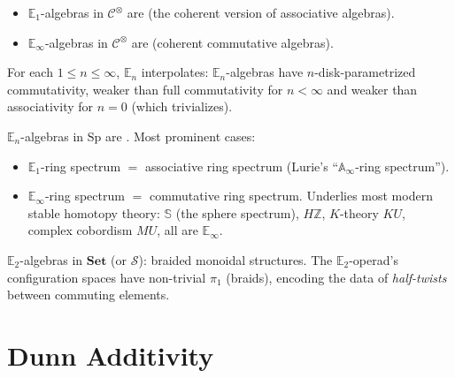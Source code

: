 \begin{theorem}
\label{thm:en-endpoints}
\begin{itemize}
  \item $\mathbb{E}_1$-algebras in $\mathcal{C}^\otimes$ are
         (the
        coherent version of associative algebras).
  \item $\mathbb{E}_\infty$-algebras in $\mathcal{C}^\otimes$ are
         (coherent
        commutative algebras).
\end{itemize}
For each $1 \leq n \leq \infty$, $\mathbb{E}_n$ interpolates:
$\mathbb{E}_n$-algebras have $n$-disk-parametrized commutativity, weaker
than full commutativity for $n < \infty$ and weaker than associativity
for $n = 0$ (which trivializes).
\end{theorem}

\begin{example_thm}
\label{ex:ring-spectra}
$\mathbb{E}_n$-algebras in $\mathrm{Sp}$ are . Most prominent cases:
\begin{itemize}
  \item $\mathbb{E}_1$-ring spectrum $=$ associative ring spectrum
        (Lurie's ``$\mathbb{A}_\infty$-ring spectrum'').
  \item $\mathbb{E}_\infty$-ring spectrum $=$ commutative ring spectrum.
        Underlies most modern stable homotopy theory: $\mathbb{S}$ (the
        sphere spectrum), $H\mathbb{Z}$, $K$-theory $KU$, complex
        cobordism $MU$, all are $\mathbb{E}_\infty$.
\end{itemize}
\end{example_thm}

\begin{example_thm}
\label{ex:e2-braided}
$\mathbb{E}_2$-algebras in $\mathbf{Set}$ (or $\mathcal{S}$): braided
monoidal structures. The $\mathbb{E}_2$-operad's configuration spaces
have non-trivial $\pi_1$ (braids), encoding the data of \emph{half-twists}
between commuting elements.
\end{example_thm}


\section{Dunn Additivity}
\label{sec:dunn-additivity}

